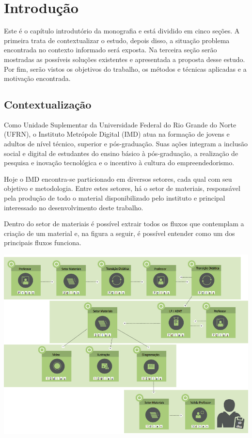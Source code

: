 \chapter{Introdução}

Este é o capítulo introdutório da monografia e está dividido em cinco seções. A primeira trata de contextualizar o estudo, depois disso, a situação problema encontrada no contexto informado será exposta. Na terceira seção serão mostradas as possíveis soluções existentes e apresentada a proposta desse estudo. Por fim, serão vistos os objetivos do trabalho, os métodos e técnicas aplicadas e a motivação encontrada.

\section{Contextualização}

Como Unidade Suplementar da Universidade Federal do Rio Grande do Norte (UFRN), o Instituto Metrópole Digital (IMD) atua na formação de jovens e adultos de nível técnico, superior e pós-graduação. Suas ações integram a inclusão social e digital de estudantes do ensino básico à pós-graduação, a realização de pesquisa e inovação tecnológica e o incentivo à cultura do empreendedorismo.

Hoje o IMD encontra-se particionado em diversos setores, cada qual com seu objetivo e metodologia. Entre estes setores, há o setor de materiais, responsável pela produção de todo o material disponibilizado pelo instituto e principal interessado no desenvolvimento deste trabalho. 

Dentro do setor de materiais é possível extrair todos os fluxos que contemplam a criação de um material e, na figura a seguir, é possível entender como um dos principais fluxos funciona. \\

\vspace{5mm}
\begin{minipage}[c]{\textwidth}
    \includegraphics[width=14cm]{Imagens/FluxoMateriaisNovos.jpg}
    \label{fig:fluxo_materiais_novos}
\end{minipage}
\vspace{5mm}

